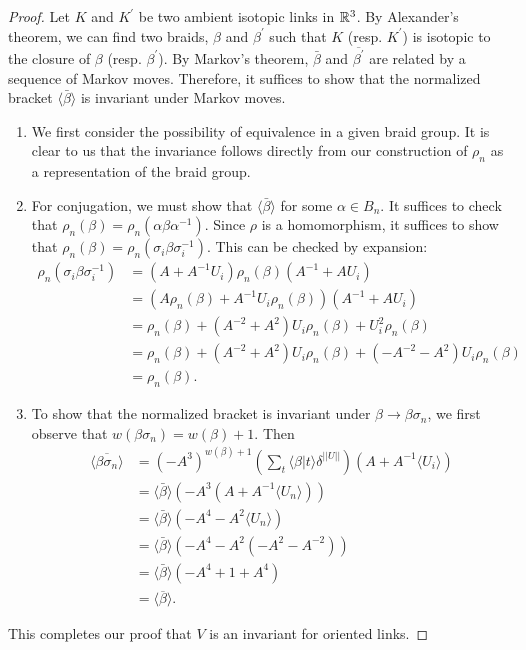 \begin{proof}
  Let $K$ and $K^{\prime}$ be two ambient isotopic links in $\mathbb{R}^3$. By Alexander's theorem, we can find two braids, $\beta$ and $\beta^{\prime}$ such that $K$ (resp. $K^{\prime}$) is isotopic to the closure of $\beta$ (resp. $\beta^{\prime}$). By Markov's theorem, $\bar{\beta}$ and $\overline{\beta^{\prime}}$ are related by a sequence of Markov moves. Therefore, it suffices to show that the normalized bracket $\langle \bar{\beta} \rangle$ is invariant under Markov moves. 
\begin{enumerate}
\item\label{item:7} We first consider the possibility of equivalence in a given braid group. It is clear to us that the invariance follows directly from our construction of $\rho_n$ as a representation of the braid group. 
\item\label{item:8} For conjugation, we must show that $\langle \bar{\beta} \rangle$ for some $\alpha \in B_n$. It suffices to check that $\rho_n(\beta) = \rho_n(\alpha\beta\alpha^{-1})$. Since $\rho$ is a homomorphism, it suffices to show that $\rho_n(\beta) = \rho_n(\sigma_i\beta\sigma^{-1}_i)$. This can be checked by expansion: 
\begin{align*}
  \rho_n (\sigma_i\beta\sigma_i^{-1}) &= (A+A^{-1}U_i)\rho_n(\beta)(A^{-1} + AU_i) \\
                                      &= (A\rho_n(\beta) + A^{-1}U_i\rho_n(\beta) )(A^{-1} + AU_i) \\
                                      &= \rho_n(\beta) + (A^{-2} + A^2)U_i\rho_n(\beta) + U_i^2\rho_n(\beta) \\
                                      &= \rho_n(\beta) + (A^{-2} + A^2)U_i\rho_n(\beta) + (-A^{-2} - A^2)U_i\rho_n(\beta) \\
  &= \rho_n(\beta).
\end{align*}
\item\label{item:9} To show that the normalized bracket is invariant under $\beta \to \beta \sigma_n$, we first observe that $w(\beta \sigma_n) = w(\beta) + 1$. Then 
\begin{align*}
  \langle \overline{\beta\sigma_n}\rangle &= (-A^3)^{w(\beta) + 1} (\sum_t^{} \langle \beta | t \rangle \delta^{||U||})(A + A^{-1}\langle U_i \rangle) \\
                                          &= \langle \bar{\beta} \rangle (-A^3(A + A^{-1}\langle U_n \rangle)) \\
                                          &= \langle \bar{\beta} \rangle (-A^4 - A^2\langle U_n \rangle) \\
                                          &= \langle \bar{\beta} \rangle (-A^4 - A^2(-A^2 - A^{-2})) \\
                                          &= \langle \bar{\beta} \rangle (-A^4 + 1 + A^4) \\
  &= \langle \overline{\beta}\rangle.
\end{align*}
\end{enumerate}
This completes our proof that $V$ is an invariant for oriented links.
\end{proof}
